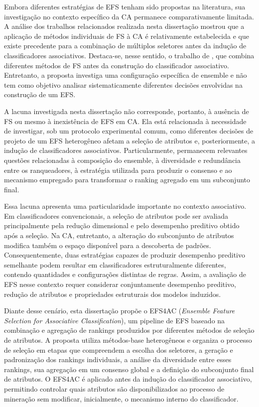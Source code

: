 Embora diferentes estratégias de EFS tenham sido propostas na literatura, sua investigação no contexto específico da CA permanece comparativamente limitada. A análise dos trabalhos relacionados realizada nesta dissertação mostrou que a aplicação de métodos individuais de FS à CA é relativamente estabelecida e que existe precedente para a combinação de múltiplos seletores antes da indução de classificadores associativos. Destaca-se, nesse sentido, o trabalho de , que combina diferentes métodos de FS antes da construção do classificador associativo. Entretanto, a proposta investiga uma configuração específica de ensemble e não tem como objetivo analisar sistematicamente diferentes decisões envolvidas na construção de um EFS.

A lacuna investigada nesta dissertação não corresponde, portanto, à ausência de FS ou mesmo à inexistência de EFS em CA. Ela está relacionada à necessidade de investigar, sob um protocolo experimental comum, como diferentes decisões de projeto de um EFS heterogêneo afetam a seleção de atributos e, posteriormente, a indução de classificadores associativos. Particularmente, permanecem relevantes questões relacionadas à composição do ensemble, à diversidade e redundância entre os ranqueadores, à estratégia utilizada para produzir o consenso e ao mecanismo empregado para transformar o ranking agregado em um subconjunto final.

Essa lacuna apresenta uma particularidade importante no contexto associativo. Em classificadores convencionais, a seleção de atributos pode ser avaliada principalmente pela redução dimensional e pelo desempenho preditivo obtido após a seleção. Na CA, entretanto, a alteração do subconjunto de atributos modifica também o espaço disponível para a descoberta de padrões. Consequentemente, duas estratégias capazes de produzir desempenho preditivo semelhante podem resultar em classificadores estruturalmente diferentes, contendo quantidades e configurações distintas de regras. Assim, a avaliação de EFS nesse contexto requer considerar conjuntamente desempenho preditivo, redução de atributos e propriedades estruturais dos modelos induzidos.

Diante desse cenário, esta dissertação propõe o EFS4AC (\textit{Ensemble Feature Selection for Associative Classification}), um pipeline de EFS baseado na combinação e agregação de rankings produzidos por diferentes métodos de seleção de atributos. A proposta utiliza métodos-base heterogêneos e organiza o processo de seleção em etapas que compreendem a escolha dos seletores, a geração e padronização dos rankings individuais, a análise da diversidade entre esses rankings, sua agregação em um consenso global e a definição do subconjunto final de atributos. O EFS4AC é aplicado antes da indução do classificador associativo, permitindo controlar quais atributos são disponibilizados ao processo de mineração sem modificar, inicialmente, o mecanismo interno do classificador.

